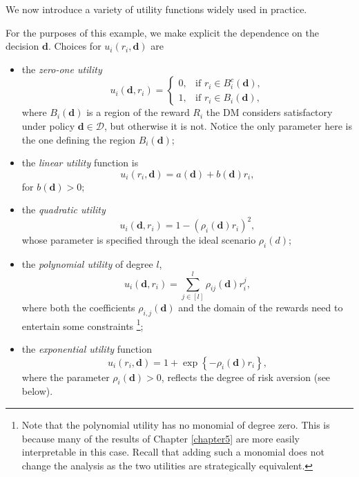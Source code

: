 We now introduce a variety of utility functions widely used in practice. 
\begin{example}
For the purposes of this example, we make explicit the dependence on the decision $\bm{d}$. Choices for $u_i(r_i,\bm{d})$ are 
\begin{itemize}
\item the \emph{zero-one utility}%
\begin{equation*}
\label{eq:01utility}
u_{i}(\bm{d},r_{i} )=\left\{
 \begin{array}{ll}
0,& \mbox{if } r_i\in B_{i}^{c}(\bm{d}), \\ 
1,& \mbox{if } r_i\in B_{i}(\bm{d}),
\end{array}
\right.
\end{equation*}%
where $B_{i}(\bm{d})$ is a region of the reward $R_{i}$ the \gls{DM} considers satisfactory under policy $\bm{d}\in\bm{\mathcal{D}}$, but otherwise it is not. Notice the only parameter here is the one defining the region $B_{i}(\bm{d})$;
\item the \emph{linear utility} function is 
\begin{equation*}
\label{eq:linearut}
u_i(r_i,\bm{d})= a(\bm{d})+b(\bm{d})r_i,
\end{equation*}
for $b(\bm{d})>0$;
\item the \emph{quadratic utility} 
\begin{equation*}
\label{eq:quadraticut}
u_{i}(\bm{d},r_{i} )=1-(\rho_{i}(\bm{d})r_{i})^{2},
\end{equation*}
 whose parameter is specified through the ideal scenario $\rho _{i}(d)$;
\item the \emph{polynomial utility} of degree $l$,
 \begin{equation*}
 \label{eq:polyut}
 u_i(\bm{d},r_i)=\sum_{j\in[l]}^l\rho_{ij}(\bm{d})r_i^j,
 \end{equation*}
where both the coefficients $\rho_{i,j}(\bm{d})$ and the domain of the rewards need to entertain some constraints \citep[see][for a discussion of these, which we omit here since are not relevant for our developments]{Keeney1993a,Muller1987}\footnote{Note that the polynomial utility has no monomial of degree zero. This is because many of the results of Chapter \ref{chapter5} are more easily interpretable in this case. Recall that adding such a monomial does not change the analysis as the two utilities are strategically equivalent.}; 
\item the \emph{exponential utility} function
\begin{equation*}
\label{eq:exput}
u_{i}(r_{i},\bm{d} )=1+\exp \left\{ -\rho _{i}(\bm{d})r_{i}\right\}, 
\end{equation*}
 where the parameter $\rho _{i}(\bm{d})>0$, reflects the degree of risk aversion (see below).
\end{itemize}
\end{example}


